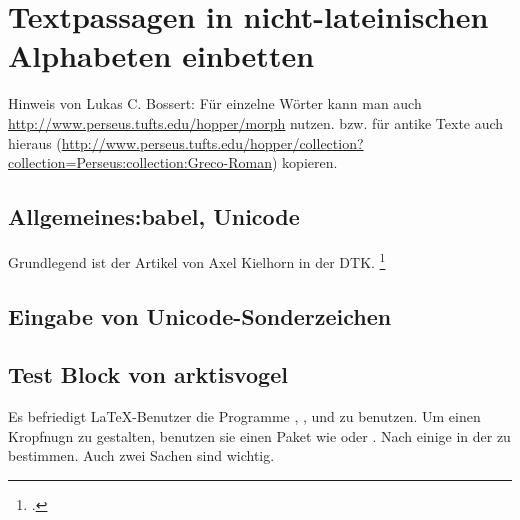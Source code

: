 \chapter{Textpassagen in nicht-lateinischen Alphabeten einbetten}

Hinweis von Lukas C. Bossert:
Für einzelne Wörter kann man auch \url{http://www.perseus.tufts.edu/hopper/morph} nutzen.
bzw. für antike Texte auch hieraus (\url{http://www.perseus.tufts.edu/hopper/collection?collection=Perseus:collection:Greco-Roman}) kopieren.

\section{Allgemeines:\enspace babel, Unicode}

Grundlegend ist der Artikel von Axel Kielhorn in der DTK.%
\footcite{kielhorn:dtk2014}

\section{Eingabe von Unicode-Sonderzeichen}
\label{unicodeeingabe}

\label{unicodeviaemacs}

\section{Test Block von arktisvogel}

\label{cpftestalpha}

Es befriedigt \LaTeX{}-Benutzer die Programme \LuaLaTeX ,
\METAFONT{}, \pdfLaTeX{} und \XeLaTeX{} zu benutzen. Um einen
Kropfnugn zu gestalten, benutzen sie einen Paket wie
 oder .
Nach einige %
%
\space%
in der %
%
\space%
zu bestimmen. Auch zwei %
\space%
Sachen sind %
%
\space%
wichtig.

